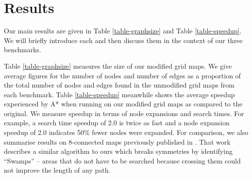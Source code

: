 \section{Results}
\label{sec-results}



Our main results are given in Table \ref{table-graphsize} and Table
\ref{table-speedup}.
We will briefly introduce each and then discuss them in the context
of our three benchmarks.
\par
Table \ref{table-graphsize} measures the size of our modified grid maps.
We give average figures for the number of nodes and number of edges
as a proportion of the total number of nodes and edges found in the 
unmodified grid maps from each benchmark. 
Table \ref{table-speedup} meanwhile shows the average speedup experienced
by A* when running on our modified grid maps as compared to the
original.  We measure speedup in terms of node expansions and search
times.  For example, a search time speedup of 2.0 is twice as fast and
a node expansion speedup of 2.0 indicates 50\% fewer nodes were expanded.
For comparison, we also summarise results on 8-connected maps previously published in \cite{pochter10}.
That work describes a similar algorithm to ours which breaks symmetries by identifying ``Swamps'' --
areas that do not have to be searched because crossing them could not improve the length of any path.
 


